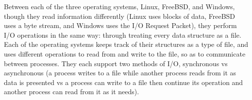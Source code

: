 \documentclass[10pt,draftclsnofoot,onecolumn]{IEEEtran}
\begin{document}
    \par
    Between each of the three operating systems, Linux, FreeBSD, and Windows, though they read information differently (Linux uses blocks of data, FreeBSD uses a byte stream, and Windows uses the I/O Request Packet), they perform I/O operations in the same way: through treating every data structure as a file. Each of the operating systems keeps track of their structures as a type of file, and uses different operations to read from and write to the file, so as to communicate between processes. They each support two methods of I/O, synchronous vs asynchronous (a process writes to a file while another process reads from it as data is presented vs a process can write to a file then continue its operation and another process can read from it as it needs).
	\newpage
    
	
\end{document}
